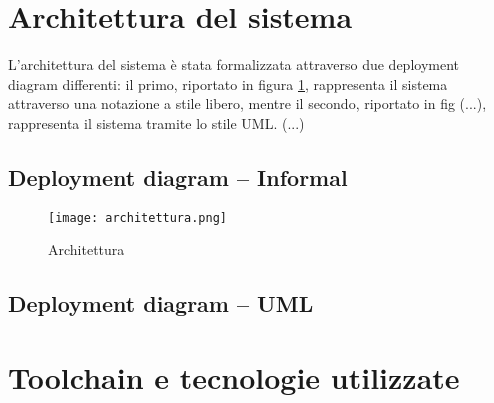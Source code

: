 \newpage
\section{Architettura del sistema}
L'architettura del sistema è stata formalizzata attraverso due deployment diagram differenti: 
il primo, riportato in figura \ref{architettura}, rappresenta il sistema
attraverso una notazione a stile libero, mentre il secondo, riportato in fig (...), rappresenta
il sistema tramite lo stile UML. (...)

\subsection{Deployment diagram -- Informal}
\begin{figure}[H]
      \centering
      \texttt{[image: architettura.png]}
      \caption{Architettura}
      \label{architettura}
\end{figure}



\subsection{Deployment diagram -- UML}

\section{Toolchain e tecnologie utilizzate}